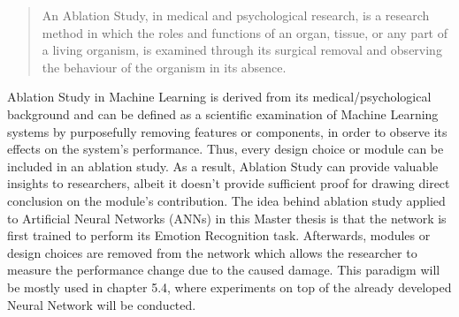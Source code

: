\begin{quote}
    An Ablation Study, in medical and psychological research, is a research method in which the roles and functions of an organ, tissue, or any part of a living organism, is examined through its surgical removal and observing the behaviour of the organism in its absence.\citep{Sheikholeslami:2019:AblationProgrammingML}
\end{quote}


Ablation Study in Machine Learning is derived from its medical/psychological background and can be defined as a scientific examination of Machine Learning systems by purposefully removing features or components, in order to observe its effects on the system's performance. Thus, every design choice or module can be included in an ablation study. As a result, Ablation Study can provide valuable insights to researchers, albeit it doesn't provide sufficient proof for drawing direct conclusion on the module's contribution. \citep{Sheikholeslami:2019:AblationProgrammingML}
\newline\newline
The idea behind ablation study applied to Artificial Neural Networks (ANNs) in this Master thesis is that the network is first trained to perform its Emotion Recognition task. Afterwards, modules or design choices are removed from the network which allows the researcher to measure the performance change due to the caused damage. This paradigm will be mostly used in chapter 5.4, where experiments on top of the already developed Neural Network will be conducted. \citep{Fadelli:2018:AblationInANN}


